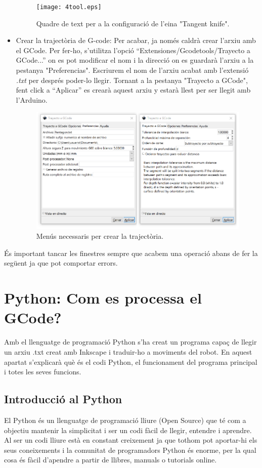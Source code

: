 \begin{itemize}
	\begin{figure}[H]
		\centering
		\texttt{[image: 4tool.eps]}
		\caption{Quadre de text per a la configuració de l'eina "Tangent knife".}
		\label{fig:tool}
	\end{figure}

	\item Crear la trajectòria de G-code: Per acabar, ja només caldrà crear l'arxiu amb el GCode. Per fer-ho, s'utilitza l'opció “Extensiones/Gcodetools/Trayecto a GCode...” on es pot modificar el nom i la direcció on es guardarà l'arxiu a la pestanya "Preferencias". Escriurem el nom de l'arxiu acabat amb l'extensió \emph{.txt} per després poder-lo llegir. Tornant a la pestanya "Trayecto a GCode", fent click a  “Aplicar” es crearà aquest arxiu y estarà llest per ser llegit amb l'Arduino.
	
	\begin{figure}[H]
		\centering
		\includegraphics[width=0.60\linewidth]{5Trajectoria.eps}
		\caption{Menús necessaris per crear la trajectòria.}
		\label{fig:trayecto}
	\end{figure}
	
\end{itemize}
És important tancar les finestres sempre que acabem una operació abans de fer la següent ja que pot comportar errors. 

\section{Python: Com es processa el GCode?}

Amb el llenguatge de programació Python s’ha creat un programa capaç de llegir un arxiu .txt creat amb Inkscape i traduir-ho a moviments del robot. En aquest apartat s’explicarà què és el codi Python, el funcionament del programa principal i totes les seves funcions. 

\subsection{Introducció al Python}
El Python és un llenguatge de programació lliure (Open Source) que té com a objectiu mantenir la simplicitat i ser un codi fàcil de llegir, entendre i aprendre. Al ser un codi lliure està en constant creixement ja que tothom pot aportar-hi els seus coneixements i la comunitat de programadors Python és enorme, per la qual cosa és fàcil d’apendre a partir de llibres, manuals o tutorials online. 

